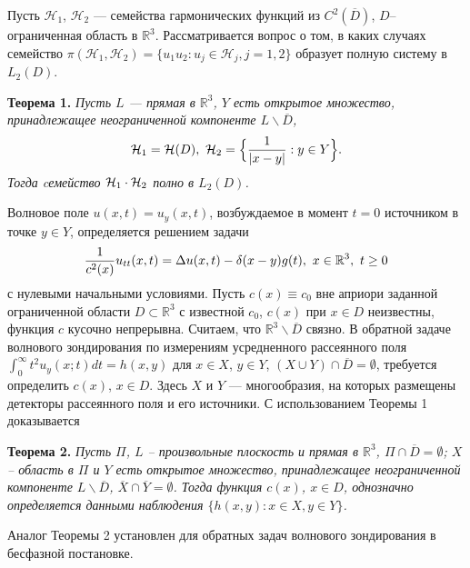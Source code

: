 
\vzmscaption
Пусть ${\mathcal H}_1$, ${\mathcal H}_2$ --- семейства гармонических функций из $C^2({\overline D})$, $D$--ограниченная область в $\mathbb{R}^3$.
Рассматривается вопрос о том, в каких случаях семейство $\pi({\mathcal H}_1,{\mathcal H}_2)=\{ u_1 u_2: u_j \in {\mathcal H}_j, j=1,2 \}$
образует полную систему в $L_2(D)$.

{\bf Теорема 1.} {\it Пусть $L$ --- прямая в $\mathbb{R}^3$, $Y$ есть открытое множество, принадлежащее неограниченной компоненте $L\backslash {\overline D}$,
$$
{\cal H}_1={\cal H}(D), \,\, {\cal H}_2=\Bigl\{ {{1}\over{\vert x-y\vert}}: y\in Y \Bigr\}.
$$
Тогда cемейство ${\cal H}_1 \cdot {\cal H}_2$ полно в $L_{2}(D)$.
}


Волновое поле $u(x,t)=u_y(x,t)$, возбуждаемое в момент $t=0$ источником в точке $y\in Y$, определяется решением задачи
$$
{{1}\over{c^2(x)}} u_{tt}(x,t)=\Delta
u(x,t)-\delta(x-y) g(t), \,\, x\in \mathbb{R}^3, \,\, t\geq 0
$$
с нулевыми начальными условиями. Пусть $c(x)\equiv c_0$ вне априори заданной ограниченной области $D \subset \mathbb{R}^3$ с известной $c_0$, $c(x)$ при $x\in D$ неизвестны, функция $c$ кусочно непрерывна. Считаем, что ${\mathbb R}^3 \backslash {\overline D}$ связно.
В обратной задаче волнового зондирования по измерениям усредненного рассеянного поля $\int_0^{\infty} t^2 u_y(x;t)dt=h(x,y)$ для $x\in X$, $y\in Y$, $(X\cup Y)\cap {\overline D}=\emptyset$, требуется определить $c(x)$, $x\in D$. Здесь $X$ и $Y$ --- многообразия, на которых размещены детекторы рассеянного поля и его источники. С использованием Теоремы 1 доказывается

{\bf Теорема 2.} {\it Пусть $\Pi$, ${L}$ -- произвольные плоскость и прямая в $\mathbb{R}^3$, $\Pi\cap {\overline D}=\emptyset$; $X$ -- область в $\Pi$ и $Y$ есть открытое множество, принадлежащее неограниченной компоненте $L\backslash {\overline D}$, ${\overline X} \cap {\overline Y}=\emptyset$. Тогда функция $c(x)$, $x\in D$, однозначно определяется данными наблюдения $\{ h(x,y): x\in X, y\in Y \}$.
}

Аналог Теоремы 2 установлен для обратных задач волнового зондирования в бесфазной постановке.
